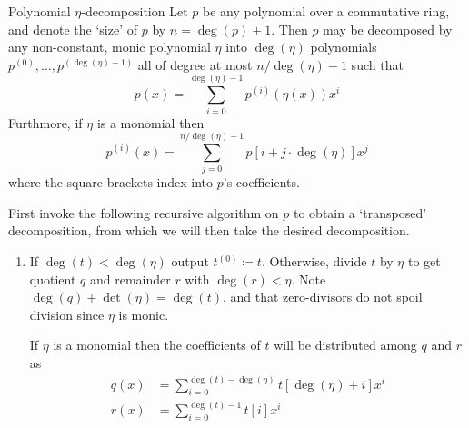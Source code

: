
\begin{theorem}{Polynomial $\eta$-decomposition}
    Let $p$ be any polynomial over a commutative ring, and denote the `size' of $p$ by $n=\deg(p)+1$.
    Then $p$ may be decomposed by any non-constant, monic polynomial $\eta$ into $\deg(\eta)$ polynomials $p^{(0)},\dots,p^{(\deg(\eta)-1)}$ all of degree at most $n/\deg(\eta)-1$ such that
    \begin{equation}
        p(x) = \sum_{i=0}^{\deg(\eta)-1} p^{(i)}(\eta(x))x^i
    \end{equation}
    Furthmore, if $\eta$ is a monomial then 
    \begin{equation}
        p^{(i)}(x) = \sum_{j=0}^{n/\deg(\eta)-1} p[i+j\cdot\deg(\eta)]x^j
    \end{equation}
    where the square brackets index into $p$'s coefficients.

    \proof
    First invoke the following recursive algorithm on $p$ to obtain a `transposed' decomposition, from which we will then take the desired decomposition.

    \begin{enumerate}
        \begin{itemize}[square]
            \item
             polynomial $t$. Let $n_t=\det(t)+1$
            \item
             polynomials $t^{(0)},\dots,t^{(\ceil{n_t/\eta}-1)}$ with $\deg(t^{(i)})<\deg(\eta)$ for all $i$ such that
            \begin{align}
                t(x) = \sum_{i=0}^{\ceil{n_t/\deg(\eta)}-1} t^{(i)}(x)\eta(x)^i
            \end{align}
            Furthermore, if $\eta$ is a monomial then
            \begin{equation}
                t^{(i)} = \sum_{j=0}^{\deg(\eta)-1} t[j+i\cdot\deg(\eta)]x^j\tag{1}\label{t-form}
            \end{equation}
        \end{itemize}

        \item
        If $\deg(t)<\deg(\eta)$ output $t^{(0)}\coloneqq t$.
        Otherwise, divide $t$ by $\eta$ to get quotient $q$ and remainder $r$ with $\deg(r)<\eta$.
        Note $\deg(q)+\det(\eta) = \deg(t)$, and that zero-divisors do not spoil division since $\eta$ is monic.

        If $\eta$ is a monomial then the coefficients of $t$ will be distributed among $q$ and $r$ as
        \begin{align}
            q(x) &= \sum_{i=0}^{\deg(t)-\deg(\eta)} t[\deg(\eta)+i]x^i \tag{2}\label{q-form} \\
            r(x) &= \sum_{i=0}^{\deg(t)-1} t[i]x^i \tag{3}\label{r-form}
        \end{align}


\end{enumerate}
\end{theorem}
